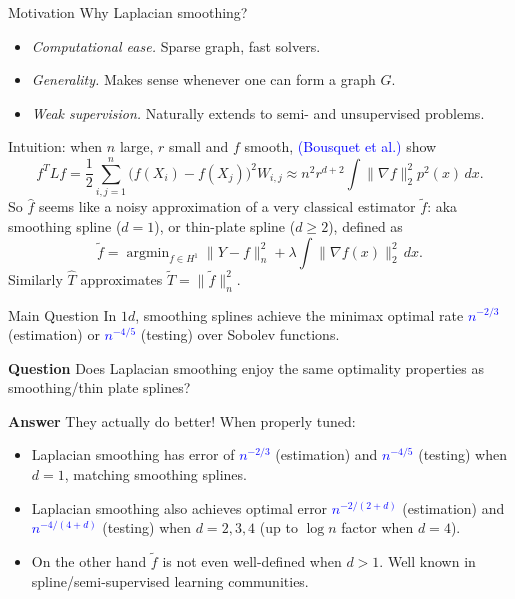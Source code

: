 \documentclass[xcolor=dvipsnames]{beamer}
\newcommand{\wh}[1]{\widehat{#1}}
\newcommand{\wt}[1]{\widetilde{#1}}
\DeclareMathOperator*{\argmin}{argmin}
\newcommand{\blue}[1]{\textcolor{blue}{#1}}
\begin{document}
\begin{frame}{Motivation}
Why Laplacian smoothing?
\begin{itemize}
	\item \emph{Computational ease.} Sparse graph, fast solvers.
	\item \emph{Generality.} Makes sense whenever one can form a graph $G$. 
	\item \emph{Weak supervision.} Naturally extends to semi- and unsupervised problems.
\end{itemize}
Intuition: when $n$ large, $r$ small and $f$ smooth, \textcolor{blue}{(Bousquet et al.)} show
\begin{equation*}
f^T L f = \frac{1}{2}\sum_{i,j = 1}^{n} \bigl(f(X_i) - f(X_j)\bigr)^2 W_{i,j} \approx n^2 r^{d + 2} \int \|\nabla f\|_2^2 p^2(x) \,dx.
\end{equation*}
So $\wh{f}$ seems like a noisy approximation of a very classical estimator $\wt{f}$: aka \alert{smoothing spline} ($d = 1$), or \alert{thin-plate spline} ($d \geq 2$), defined as
\begin{equation*}
\widetilde{f} = \argmin_{f \in H^1} \|Y - f\|_n^2 + \lambda \int \|\nabla f(x)\|_2^2  \,dx.
\end{equation*}
Similarly $\wh{T}$ approximates $\wt{T} = \|\wt{f}\|_n^2$. 
\end{frame}

\begin{frame}{Main Question}
In $1d$, smoothing splines achieve the minimax optimal rate \blue{$n^{-2/3}$} (estimation) or \blue{$n^{-4/5}$} (testing) over Sobolev functions.
\begin{block}{{\bf Question}}
	Does Laplacian smoothing enjoy the same optimality properties as smoothing/thin plate splines?
\end{block}

\begin{block}{{\bf Answer}}
	They actually do better! When properly tuned:
	\begin{itemize}
		\item Laplacian smoothing has error of \blue{$n^{-2/3}$} (estimation) and \blue{$n^{-4/5}$} (testing) when $d = 1$, matching smoothing splines.
		\item Laplacian smoothing also achieves optimal error \blue{$n^{-2/(2 + d)}$} (estimation) and \blue{$n^{-4/(4 + d)}$} (testing) when $d = 2,3,4$ (up to $\log n$ factor when $d = 4$).
		\item On the other hand $\wt{f}$ is \alert{not even well-defined} when $d > 1$. Well known in spline/semi-supervised learning communities.
	\end{itemize}
\end{block}
\end{frame}
\end{document}
